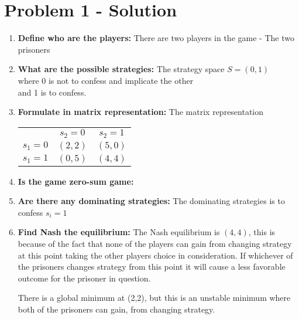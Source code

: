 \section{Problem 1 - Solution}
\begin{enumerate}
\item \textbf{Define who are the players:} There are two players in the game - The two prisoners
\item \textbf{What are the possible strategies:} The strategy space $S = (0,1)$ \\
  where 0 is not to confess and implicate the other                             \\
  and 1 is to confess.
\item \textbf{Formulate in matrix representation:} The matrix representation
  \begin{center}
    \begin{tabular}{ r|c|c| }
      \multicolumn{1}{r}{}
      & \multicolumn{1}{c}{$s_2 = 0$}
      & \multicolumn{1}{c}{$s_2 = 1$}                                   \\
      \cline{2-3}
      $s_1 = 0$ & $(2,2)$ & $(5,0)$                                               \\
      \cline{2-3}
      $s_1 = 1$ & $(0,5)$ & $(4,4)$                                               \\
      \cline{2-3}
    \end{tabular}
  \end{center}
\item \textbf{Is the game zero-sum game:}
\item \textbf{Are there any dominating strategies:} The dominating strategies is to confess $s_i = 1$
\item \textbf{Find Nash the equilibrium:} The Nash equilibrium is $(4,4)$, this is because of the fact that none of the
  players can gain from changing strategy at this point taking the other players choice in consideration. If whichever of
  the prisoners changes strategy from this point it will cause a less favorable outcome for the prisoner in question.

  There is a global minimum at (2,2), but this is an unstable minimum where both of the prisoners can gain, from
  changing strategy.
\end{enumerate}

